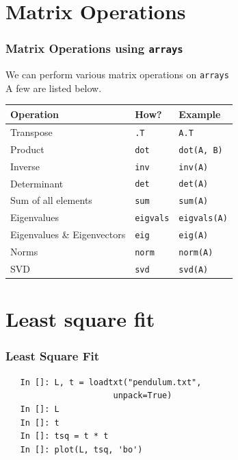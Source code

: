 \section{Matrix Operations}

\begin{frame}[fragile]
  \frametitle{Matrix Operations using \texttt{arrays}}
  We can perform various matrix operations on \texttt{arrays}\\ 
  A few are listed below.

  \begin{center}
    \begin{tabular}{lll}
      Operation                    &  How?           &  Example           \\
      \hline
      Transpose                    &  \texttt{.T}       &  \texttt{A.T}         \\
      Product                      &  \texttt{dot}      &  \texttt{dot(A, B)}   \\
      Inverse                      &  \texttt{inv}      &  \texttt{inv(A)}      \\
      Determinant                  &  \texttt{det}      &  \texttt{det(A)}      \\
      Sum of all elements          &  \texttt{sum}      &  \texttt{sum(A)}      \\
      Eigenvalues                  &  \texttt{eigvals}  &  \texttt{eigvals(A)}  \\
      Eigenvalues \& Eigenvectors  &  \texttt{eig}      &  \texttt{eig(A)}      \\
      Norms                        &  \texttt{norm}     &  \texttt{norm(A)}     \\
      SVD                          &  \texttt{svd}      &  \texttt{svd(A)}      \\
    \end{tabular}
  \end{center}
\end{frame}

\section{Least square fit}

\begin{frame}[fragile]
  \frametitle{Least Square Fit}
  \begin{lstlisting}
   In []: L, t = loadtxt("pendulum.txt", 
                      unpack=True)
   In []: L
   In []: t
   In []: tsq = t * t
   In []: plot(L, tsq, 'bo')
\end{lstlisting}
\end{frame}

